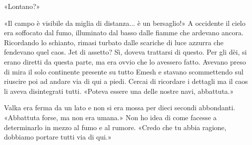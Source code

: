«Lontano?»

«Il campo è visibile da miglia di distanza... è un bersaglio!» A
occidente il cielo era soffocato dal fumo, illuminato dal basso dalle
fiamme che ardevano ancora. Ricordando lo schianto, rimasi turbato dalle
scariche di luce azzurra che fendevano quel caos. Jet di assetto? Sì,
doveva trattarsi di questo. Per gli dèi, si erano diretti da questa
parte, ma era ovvio che lo avessero fatto. Avevano preso di mira il solo
continente presente su tutto Emesh e stavano scommettendo sul riuscire
poi ad andare via di qui a piedi. Cercai di ricordare i dettagli ma il
caos li aveva disintegrati tutti. «Poteva essere una delle nostre navi,
abbattuta.»

Valka era ferma da un lato e non si era mossa per dieci secondi
abbondanti. «Abbattuta forse, ma non era umana.» Non ho idea di come
facesse a determinarlo in mezzo al fumo e al rumore. «Credo che tu abbia
ragione, dobbiamo portare tutti via di qui.»


